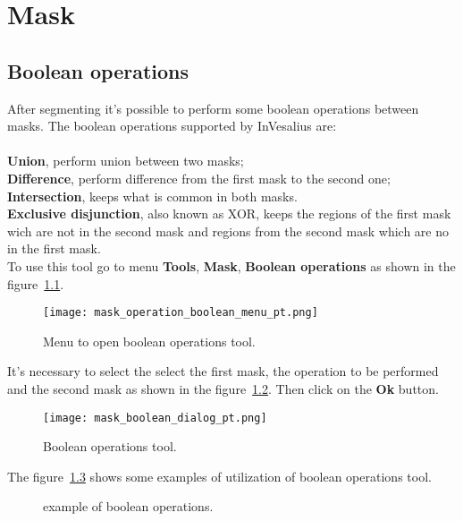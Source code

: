 \chapter{Mask}


\section{Boolean operations}

After segmenting it's possible to perform some boolean operations between masks. The boolean operations supported by InVesalius are:\\
\\
\textbf{Union}, perform union between two masks;\\
\textbf{Difference}, perform difference from the first mask to the second one;\\
\textbf{Intersection}, keeps what is common in both masks.\\
\textbf{Exclusive disjunction}, also known as XOR, keeps the regions of the first mask wich are not in the second mask and regions from the second mask which are no in the first mask.\\

To use this tool go to menu \textbf{Tools}, \textbf{Mask}, \textbf{Boolean operations} as shown in the figure~\ref{fig:booleano_menu}.

\begin{figure}[!htb]
\centering
\texttt{[image: mask\_operation\_boolean\_menu\_pt.png]}
\caption{Menu to open boolean operations tool.}
\label{fig:booleano_menu}
\end{figure}

It's necessary to select the select the first mask, the operation to be performed and the second mask as shown in the figure~\ref{fig:booleano_janela}. Then click on the \textbf{Ok} button.

\begin{figure}[!htb]
\centering
\texttt{[image: mask\_boolean\_dialog\_pt.png]}
\caption{Boolean operations tool.}
\label{fig:booleano_janela}
\end{figure}

The figure~\ref{fig:op_boolana} shows some examples of utilization of boolean operations tool.

\begin{figure}[!htb]
  \centering
  \hfill
  \hfill
  \hfill
  \hfill
  \hfill
  \caption{example of boolean operations.}
  \label{fig:op_boolana}
\end{figure}

